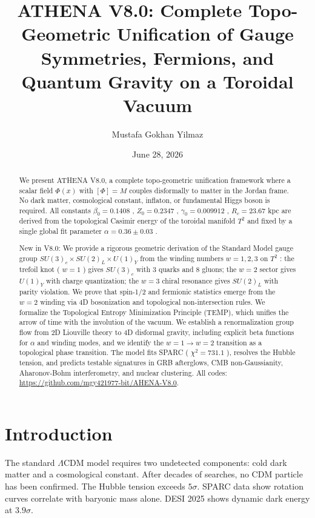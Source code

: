 \documentclass[11pt,a4paper]{article}
\title{ATHENA V8.0: Complete Topo-Geometric Unification of Gauge Symmetries, Fermions, and Quantum Gravity on a Toroidal Vacuum}
\author{Mustafa Gokhan Yilmaz}
\date{June 28, 2026}
\begin{document}
\maketitle

\begin{abstract}
We present ATHENA V8.0, a complete topo-geometric unification framework where a scalar field \(\Phi (x)\) with \([\Phi ] = M\) couples disformally to matter in the Jordan frame. No dark matter, cosmological constant, inflaton, or fundamental Higgs boson is required. All constants \(\beta_0 = 0.1408\) , \(Z_0 = 0.2347\) , \(\gamma_0 = 0.009912\) , \(R_c = 23.67\) kpc are derived from the topological Casimir energy of the toroidal manifold \(T^2\) and fixed by a single global fit parameter \(\alpha = 0.36 \pm 0.03\) .

New in V8.0: We provide a rigorous geometric derivation of the Standard Model gauge group \(SU(3)_c \times SU(2)_L \times U(1)_Y\) from the winding numbers \(w = 1, 2, 3\) on \(T^2\) : the trefoil knot ( \(w = 1\) ) gives \(SU(3)_c\) with 3 quarks and 8 gluons; the \(w = 2\) sector gives \(U(1)_Y\) with charge quantization; the \(w = 3\) chiral resonance gives \(SU(2)_L\) with parity violation. We prove that spin-1/2 and fermionic statistics emerge from the \(w = 2\) winding via 4D bosonization and topological non-intersection rules. We formalize the Topological Entropy Minimization Principle (TEMP), which unifies the arrow of time with the involution of the vacuum. We establish a renormalization group flow from 2D Liouville theory to 4D disformal gravity, including explicit beta functions for \(\alpha\) and winding modes, and we identify the \(w = 1 \to w = 2\) transition as a topological phase transition. The model fits SPARC ( \(\chi^2 = 731.1\) ), resolves the Hubble tension, and predicts testable signatures in GRB afterglows, CMB non-Gaussianity, Aharonov-Bohm interferometry, and nuclear clustering. All codes: \url{https://github.com/mgy421977-bit/AHENA-V8.0}.
\end{abstract}

\section{Introduction}
The standard \(\Lambda\)CDM model requires two undetected components: cold dark matter and a cosmological constant. After decades of searches, no CDM particle has been confirmed. The Hubble tension exceeds \(5\sigma\). SPARC data show rotation curves correlate with baryonic mass alone. DESI 2025 shows dynamic dark energy at \(3.9\sigma\).
\end{document}
